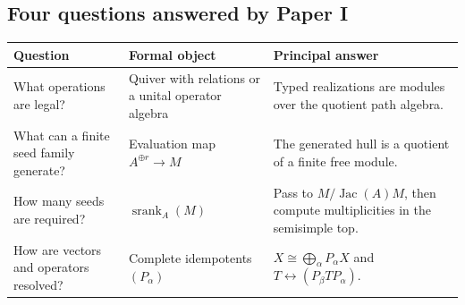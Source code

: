 \documentclass[11pt]{article}
\theoremstyle{definition}
\theoremstyle{remark}
\theoremstyle{definition}\newtheorem{example}[theorem]{Example}
\newcommand{\srank}{\operatorname{srank}}
\newcommand{\Jac}{\operatorname{Jac}}
\begin{document}
\subsection*{Four questions answered by Paper I}
\begin{center}
\begin{tabularx}{0.96\textwidth}{@{}>{\raggedright\arraybackslash}p{}Y Y@{}}
\toprule
\textbf{Question} & \textbf{Formal object} & \textbf{Principal answer}\\
\midrule
What operations are legal? & Quiver with relations or a unital operator algebra & Typed realizations are modules over the quotient path algebra.\\
What can a finite seed family generate? & Evaluation map \(A^{\oplus r}\to M\) & The generated hull is a quotient of a finite free module.\\
How many seeds are required? & \(\srank_A(M)\) & Pass to \(M/\Jac(A)M\), then compute multiplicities in the semisimple top.\\
How are vectors and operators resolved? & Complete idempotents \((P_\alpha)\) & \(X\cong\bigoplus_\alpha P_\alpha X\) and \(T\leftrightarrow(P_\beta TP_\alpha)\).\\
\bottomrule
\end{tabularx}
\end{center}
\end{document}
